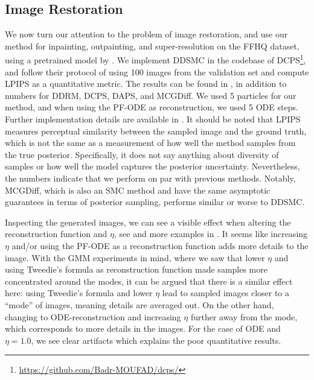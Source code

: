 \documentclass{proc}
\begin{document}
\subsection{Image Restoration}


We now turn our attention to the problem of image restoration, and use our method for inpainting, outpainting, and super-resolution on the FFHQ \citep{karras_style-based_2019} dataset, using a pretrained model by \citet{chung_diffusion_2023}. We implement DDSMC in the codebase of DCPS\footnote{\url{https://github.com/Badr-MOUFAD/dcps/}}, and follow their protocol of using 100 images from the validation set and compute LPIPS \citep{zhang_unreasonable_2018} as a quantitative metric. The results can be found in , in addition to numbers for DDRM, DCPS, DAPS, and MCGDiff. We used 5 particles for our method, and when using the PF-ODE as reconstruction, we used 5 ODE steps. Further implementation details are available in . It should be noted that LPIPS measures perceptual similarity between the sampled image and the ground truth, which is not the same as a measurement of how well the method samples from the true posterior. Specifically, it does not say anything about diversity of samples or how well the model captures the posterior uncertainty. Nevertheless, the numbers indicate that we perform on par with previous methods. Notably, MCGDiff, which is also an SMC method and have the same asymptotic guarantees in terms of posterior sampling, performs similar or worse to DDSMC. 

Inspecting the generated images, we can see a visible effect when altering the reconstruction function and $\eta$, see  and more examples in . It seems like increasing $\eta$ and/or using the PF-ODE as a reconstruction function adds more details to the image. With the GMM experiments in mind, where we saw that lower $\eta$ and using Tweedie's formula as reconstruction function made samples more concentrated around the modes, it can be argued that there is a similar effect here: using Tweedie's formula and lower $\eta$ lead to sampled images closer to a ``mode'' of images, meaning details are averaged out. On the other hand, changing to ODE-reconstruction and increasing $\eta$ further away from the mode, which corresponds to more details in the images. For the case of ODE and $\eta=1.0$, we see clear artifacts which explains the poor quantitative results.
\end{document}
